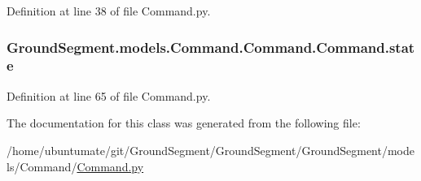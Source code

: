 Definition at line 38 of file Command.\+py.

\hypertarget{class_ground_segment_1_1models_1_1_command_1_1_command_1_1_command_aef227348bd4c4318c4581d0129883207}{}
\subsubsection[{state}]{\setlength{\rightskip}{0pt plus 5cm}Ground\+Segment.\+models.\+Command.\+Command.\+Command.\+state}\label{class_ground_segment_1_1models_1_1_command_1_1_command_1_1_command_aef227348bd4c4318c4581d0129883207}


Definition at line 65 of file Command.\+py.



The documentation for this class was generated from the following file\+:\begin{DoxyCompactItemize}
\item 
/home/ubuntumate/git/\+Ground\+Segment/\+Ground\+Segment/\+Ground\+Segment/models/\+Command/\hyperlink{_command_8py}{Command.\+py}\end{DoxyCompactItemize}

